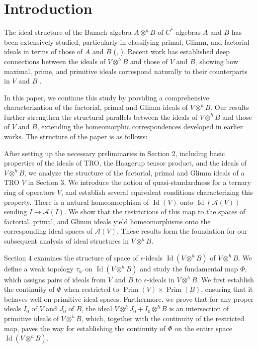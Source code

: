 \documentclass{birkjour}
\theoremstyle{definition}
\theoremstyle{remark}
\numberwithin{equation}{section}
\begin{document}
\section{Introduction}
The ideal structure of the Banach algebra  $A \otimes^h B$ of $C^{\ast}$-algebras $A$ and $B$ has been extensively studied,  particularly in classifying primal, Glimm, and factorial ideals in terms of those of $A$ and $B$ (\cite{AS}, \cite{AR}).  Recent work has established deep connections between the ideals of 
$V \otimes^h B$ and those of $V$ and $B$, showing how maximal, prime, and primitive ideals correspond naturally to their counterparts in $V$ and $B$ \cite{AKKKK}.  



In this paper, we continue this study by providing a comprehensive characterization of the factorial, primal and Glimm ideals of $V \otimes^h B$. Our results further strengthen the structural parallels between the ideals of $V \otimes^h B$ and those of $V$ and $B$, extending the homeomorphic correspondences developed in earlier works. The structure of the paper is as follows: 

After setting up the necessary preliminaries in Section $2$, including basic properties of the ideals of TRO, the Haagerup tensor product, and the ideals of $V \otimes^h B$, we analyze the structure of the factorial, primal and Glimm ideals of a TRO
$V$ in Section $3$. We introduce the notion of quasi-standardness for a ternary ring of operators  $V$, and establish several equivalent conditions characterizing this property. There is a natural homeomorphism of $\operatorname{Id}(V)$ onto $\operatorname{Id}(\mathcal{A}(V))$ sending $I \to \mathcal{A}(I)$. We show that the restrictions of this map to the spaces of factorial, primal, and Glimm ideals yield homeomorphisms onto the corresponding ideal spaces of $\mathcal{A}(V)$. These results form the foundation for our subsequent analysis of ideal structures in $V \otimes^h B$.

Section $4$ examines the structure of space of $\epsilon$-ideals $\operatorname{Id}(V \otimes^h B)$ of $V \otimes^h B$. We define a weak topology $\tau_w$ on $\operatorname{Id}(V \otimes^h B)$ and study the fundamental map $\Phi$, which assigns pairs of ideals from $V$ and $B$ to $\epsilon$-ideals in $V \otimes^h B$. We first establish the continuity of $\Phi$ when restricted to 
$\operatorname{Prim}(V) \times \operatorname{Prim}(B)$, ensuring that it behaves well on primitive ideal spaces. Furthermore, we prove that for any proper ideals \( I_0 \) of \( V \) and \( J_0 \) of \( B \), the ideal \( V \otimes^{h} J_0 + I_0 \otimes^{h} B \) is an intersection of  primitive ideals of \( V \otimes^{h} B \), which, together with the continuity of the restricted map, paves the way for establishing the continuity of 
$\Phi$ on the entire space $\operatorname{Id}(V \otimes^h B)$. 
\end{document}
